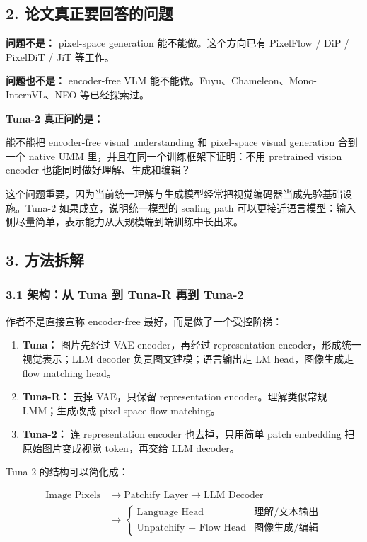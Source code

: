 \subsection{2. 论文真正要回答的问题}

\textbf{问题不是：} pixel-space generation 能不能做。这个方向已有 PixelFlow / DiP / PixelDiT / JiT 等工作。

\textbf{问题也不是：} encoder-free VLM 能不能做。Fuyu、Chameleon、Mono-InternVL、NEO 等已经探索过。

\textbf{Tuna-2 真正问的是：}

\begin{intubox}
能不能把 encoder-free visual understanding 和 pixel-space visual generation 合到一个 native UMM 里，并且在同一个训练框架下证明：不用 pretrained vision encoder 也能同时做好理解、生成和编辑？
\end{intubox}

这个问题重要，因为当前统一理解与生成模型经常把视觉编码器当成先验基础设施。Tuna-2 如果成立，说明统一模型的 scaling path 可以更接近语言模型：输入侧尽量简单，表示能力从大规模端到端训练中长出来。

\subsection{3. 方法拆解}

\subsubsection{3.1 架构：从 Tuna 到 Tuna-R 再到 Tuna-2}

作者不是直接宣称 encoder-free 最好，而是做了一个受控阶梯：

\begin{enumerate}[leftmargin=1.5em]
  \item \textbf{Tuna：} 图片先经过 VAE encoder，再经过 representation encoder，形成统一视觉表示；LLM decoder 负责图文建模；语言输出走 LM head，图像生成走 flow matching head。
  \item \textbf{Tuna-R：} 去掉 VAE，只保留 representation encoder。理解类似常规 LMM；生成改成 pixel-space flow matching。
  \item \textbf{Tuna-2：} 连 representation encoder 也去掉，只用简单 patch embedding 把原始图片变成视觉 token，再交给 LLM decoder。
\end{enumerate}

Tuna-2 的结构可以简化成：

\[
\begin{aligned}
\text{Image Pixels}
&\rightarrow \text{Patchify Layer}
\rightarrow \text{LLM Decoder} \\
&\rightarrow
\begin{cases}
\text{Language Head} & \text{理解/文本输出}\\
\text{Unpatchify + Flow Head} & \text{图像生成/编辑}
\end{cases}
\end{aligned}
\]

